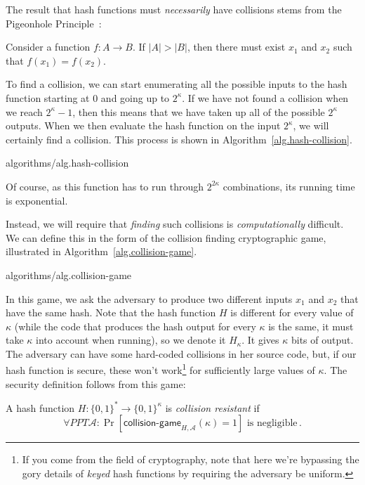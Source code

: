 The result that hash
functions must \emph{necessarily} have collisions stems from the Pigeonhole
Principle~\cite{liu}:

\begin{theorem}[Pigeonhole]
  Consider a function $f: A \longrightarrow B$. If $|A| > |B|$, then there must
  exist $x_1$ and $x_2$ such that $f(x_1) = f(x_2)$.
\end{theorem}

To find a collision, we can start enumerating all the possible
inputs to the hash function starting at $0$ and going up to $2^\kappa$. If we have
not found a collision when we reach $2^\kappa - 1$, then this means that we have taken
up all of the possible $2^\kappa$ outputs. When we then evaluate the hash function on
the input $2^\kappa$, we will certainly find a collision. This process is shown in
Algorithm~\ref{alg.hash-collision}.

{algorithms/alg.hash-collision}

Of course, as this function has to run through
$2^{2\kappa}$ combinations, its running time is exponential.

Instead, we will require that \emph{finding} such collisions is \emph{computationally}
difficult. We can define this in the form of the collision finding cryptographic game,
illustrated in Algorithm~\ref{alg.collision-game}.

{algorithms/alg.collision-game}

In this game, we ask the adversary to produce two different inputs $x_1$ and $x_2$
that have the same hash. Note that the hash function $H$ is different
for every value of $\kappa$ (while the code that produces the hash output for every
$\kappa$ is the same, it must take $\kappa$ into account when running), so we
denote it $H_\kappa$. It gives $\kappa$ bits of output. The adversary can have some
hard-coded collisions in her source code, but, if our hash function is secure, these won't
work\footnote{If you come from the field of cryptography,
note that here we're bypassing the gory details of \emph{keyed} hash functions
by requiring the adversary be uniform.}
for sufficiently large values of $\kappa$. The security definition follows from this game:

\begin{definition}
  A hash function $H: \{0, 1\}^* \longrightarrow \{0, 1\}^\kappa$ is \emph{collision resistant}
  if
  \[
    \forall PPT \mathcal{A}:
    \Pr[\textsf{collision-game}_{H,\mathcal{A}}(\kappa) = 1] \text{ is negligible}\,.
  \]
\end{definition}

